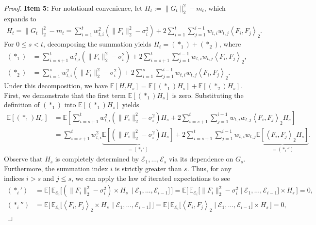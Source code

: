 \documentclass[a4paper, 11pt]{article}
\newcommand{\E}{\mathbb E}
\newcommand{\T}{\mathcal E}
\theoremstyle{definition}
\begin{document}
\begin{proof}
	\vspace{5pt}
	\noindent
	\textbf{Item 5:}
	For notational convenience, let $H_t := \| G_t \|_2^2 - m_t$, which expands to
	\begin{align}
		H_t = \| G_t \|_2^2 - m_t = \sum_{i=1}^{t} w_{t,i}^2 \left( \| F_i \|_2^2 - \sigma_i^2 \right) + 2 \sum_{i = 1}^{t} \sum_{j = 1}^{i-1} w_{t,i} w_{t,j} \left\langle F_i, F_j \right\rangle_2 .
	\end{align}
	For $0 \le s < t$, decomposing the summation yields $H_t = (*_1) + (*_2)$, where
	\begin{align}
		(*_1) & = \sum_{i=s+1}^{t} w_{t,i}^2 \left( \| F_i \|_2^2 - \sigma_i^2 \right) + 2 \sum_{i = s+1}^{t} \sum_{j = 1}^{i-1} w_{t,i} w_{t,j} \left\langle F_i, F_j \right\rangle_2 , \\
		(*_2) & = \sum_{i=1}^{s} w_{t,i}^2 \left( \| F_i \|_2^2 - \sigma_i^2 \right) + 2 \sum_{i = 1}^{s} \sum_{j = 1}^{i-1} w_{t,i} w_{t,j} \left\langle F_i, F_j \right\rangle_2 .
	\end{align}
	Under this decomposition, we have $\E[ H_t H_s ] = \E[ (*_1) H_s ] + \E[ (*_2) H_s ]$.
	First, we demonstrate that the first term $\E[ (*_1) H_s]$ is zero.
	Substituting the definition of $(*_1)$ into $\E[ (*_1) H_s]$ yields
	\begin{align}
		\E\left[ (*_1) H_s \right] & = \E\left[ \sum_{i=s+1}^{t} w_{t,i}^2 \left( \| F_i \|_2^2 - \sigma_i^2 \right) H_s + 2 \sum_{i = s+1}^{t} \sum_{j = 1}^{i-1} w_{t,i} w_{t,j} \left\langle F_i, F_j \right\rangle_2 H_s \right] \\
		& = \sum_{i=s+1}^{t} w_{t,i}^2 \underbrace{ \E\left[ \left( \| F_i \|_2^2 - \sigma_i^2 \right) H_s \right] }_{ =(*_i') } + 2 \sum_{i = s+1}^{t} \sum_{j = 1}^{i-1} w_{t,i} w_{t,j} \underbrace{ \E\left[ \left\langle F_i, F_j \right\rangle_2 H_s \right] }_{ =(*_i'') } .
	\end{align}
    Observe that $H_s$ is completely determined by $\T_1, \dots, \T_{s}$ via its dependence on $G_s$.
    Furthermore, the summation index $i$ is strictly greater than $s$.
    Thus, for any indices $i > s$ and $j \le s$, we can apply the law of iterated expectations to see
	\begin{align}
		(*_i') & = \E\Big[ \, \E_{\T_i}\big[ (\| F_i \|_2^2 - \sigma_i^2) \times H_s \, \mid \T_1, \dots, \T_{i-1} \big] \, \Big] = \E\Big[ \, \E_{\T_i}\big[ \| F_i \|_2^2 - \sigma_i^2 \mid \T_1, \dots, \T_{i-1} \big] \times H_s \, \Big] = 0 , \\
		(*_i'') & = \E\Big[ \, \E_{\T_i}\big[ \left\langle F_i, F_j \right\rangle_2 \times H_s \, \mid \T_1, \dots, \T_{i-1} \big] \, \Big] = \E\Big[ \, \E_{\T_i}\big[ \left\langle F_i, F_j \right\rangle_2  \mid \T_1, \dots, \T_{i-1} \big] \times H_s \, \Big] = 0 ,

\end{align}
\end{proof}
\end{document}

